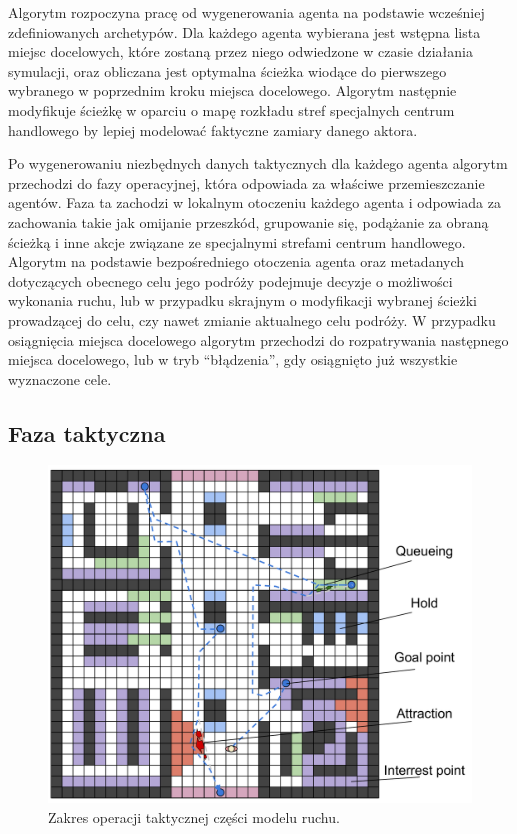 \documentclass[a4paper, 12pt]{article}
\begin{document}
Algorytm rozpoczyna pracę od wygenerowania agenta na podstawie wcześniej zdefiniowanych archetypów.
Dla każdego agenta wybierana jest wstępna lista miejsc docelowych, które zostaną przez niego odwiedzone w czasie działania symulacji, oraz obliczana jest optymalna ścieżka wiodące do pierwszego wybranego w poprzednim kroku miejsca docelowego. Algorytm następnie modyfikuje ścieżkę w oparciu o mapę rozkładu stref specjalnych centrum handlowego by lepiej modelować faktyczne zamiary danego aktora.

Po wygenerowaniu niezbędnych danych taktycznych dla każdego agenta algorytm przechodzi do fazy operacyjnej, która odpowiada za właściwe przemieszczanie agentów. Faza ta zachodzi w lokalnym otoczeniu każdego agenta i odpowiada za zachowania takie jak omijanie przeszkód, grupowanie się, podążanie za obraną ścieżką i inne akcje związane ze specjalnymi strefami centrum handlowego.
Algorytm na podstawie bezpośredniego otoczenia agenta oraz metadanych dotyczących obecnego celu jego podróży podejmuje decyzje o możliwości wykonania ruchu, lub w przypadku skrajnym o modyfikacji wybranej ścieżki prowadzącej do celu, czy nawet zmianie aktualnego celu podróży.
W przypadku osiągnięcia miejsca docelowego algorytm przechodzi do rozpatrywania następnego miejsca docelowego, lub w tryb ``błądzenia'', gdy osiągnięto już wszystkie wyznaczone cele.

\newpage
        \subsection{Faza taktyczna}
        \label{sec:tactical}

        \begin{figure}[H]
            \centering
            \includegraphics[scale=0.3]{./img/Tactical.pdf}
            \caption{Zakres operacji taktycznej części modelu ruchu.}
            \label{fig:tactical}
        \end{figure}
\end{document}
